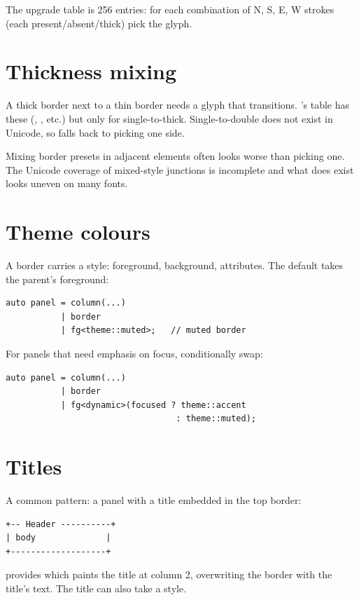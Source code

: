 The upgrade table is 256 entries: for each combination of N, S,
E, W strokes (each present/absent/thick) pick the glyph.

\section{Thickness mixing}

A thick border next to a thin border needs a glyph that
transitions. \maya{}'s table has these (,
, etc.) but only for single-to-thick.
Single-to-double does not exist in Unicode, so \maya{} falls
back to picking one side.

\begin{warning}
Mixing border presets in adjacent elements often looks worse
than picking one. The Unicode coverage of mixed-style
junctions is incomplete and what does exist looks uneven on
many fonts.
\end{warning}

\section{Theme colours}

A border carries a style: foreground, background, attributes.
The default takes the parent's foreground:

\begin{lstlisting}
auto panel = column(...)
           | border
           | fg<theme::muted>;   // muted border
\end{lstlisting}

For panels that need emphasis on focus, conditionally swap:

\begin{lstlisting}
auto panel = column(...)
           | border
           | fg<dynamic>(focused ? theme::accent
                                  : theme::muted);
\end{lstlisting}

\section{Titles}

A common pattern: a panel with a title embedded in the top
border:

\begin{lstlisting}
+-- Header ----------+
| body              |
+-------------------+
\end{lstlisting}

\maya{} provides  which paints
the title at column 2, overwriting the border with the title's
text. The title can also take a style.

